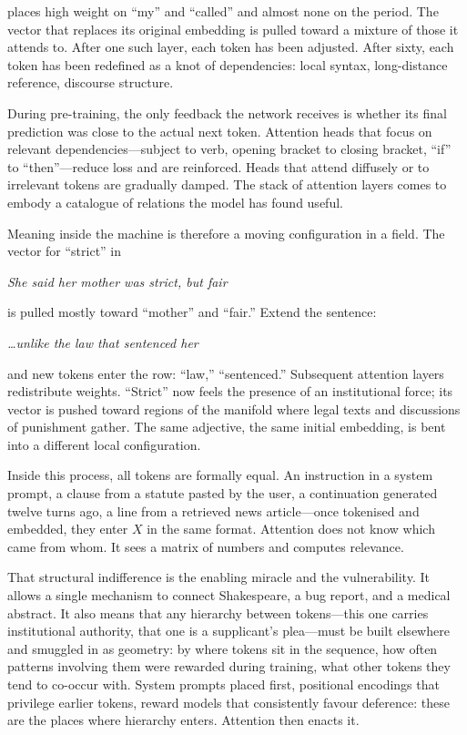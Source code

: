 \documentclass[12pt,a4paper]{article}
\begin{document}
places high weight on ``my'' and ``called'' and almost none on the period. The vector that replaces its original embedding is pulled toward a mixture of those it attends to. After one such layer, each token has been adjusted. After sixty, each token has been redefined as a knot of dependencies: local syntax, long-distance reference, discourse structure.

During pre-training, the only feedback the network receives is whether its final prediction was close to the actual next token. Attention heads that focus on relevant dependencies---subject to verb, opening bracket to closing bracket, ``if'' to ``then''---reduce loss and are reinforced. Heads that attend diffusely or to irrelevant tokens are gradually damped. The stack of attention layers comes to embody a catalogue of relations the model has found useful.

Meaning inside the machine is therefore a moving configuration in a field. The vector for ``strict'' in

\medskip
\noindent\emph{She said her mother was strict, but fair}
\medskip

is pulled mostly toward ``mother'' and ``fair.'' Extend the sentence:

\medskip
\noindent\emph{\ldots unlike the law that sentenced her}
\medskip

and new tokens enter the row: ``law,'' ``sentenced.'' Subsequent attention layers redistribute weights. ``Strict'' now feels the presence of an institutional force; its vector is pushed toward regions of the manifold where legal texts and discussions of punishment gather. The same adjective, the same initial embedding, is bent into a different local configuration.

Inside this process, all tokens are formally equal. An instruction in a system prompt, a clause from a statute pasted by the user, a continuation generated twelve turns ago, a line from a retrieved news article---once tokenised and embedded, they enter $X$ in the same format. Attention does not know which came from whom. It sees a matrix of numbers and computes relevance.

That structural indifference is the enabling miracle and the vulnerability. It allows a single mechanism to connect Shakespeare, a bug report, and a medical abstract. It also means that any hierarchy between tokens---this one carries institutional authority, that one is a supplicant's plea---must be built elsewhere and smuggled in as geometry: by where tokens sit in the sequence, how often patterns involving them were rewarded during training, what other tokens they tend to co-occur with. System prompts placed first, positional encodings that privilege earlier tokens, reward models that consistently favour deference: these are the places where hierarchy enters. Attention then enacts it.
\end{document}
